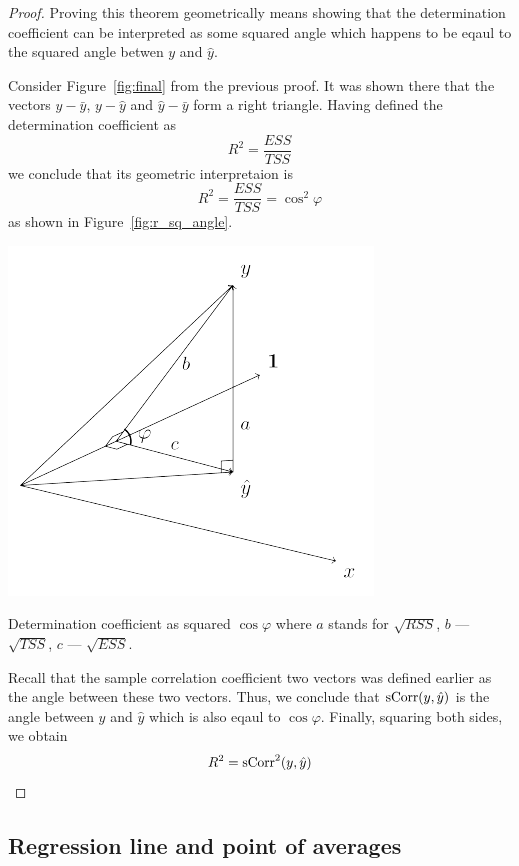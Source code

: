 \begin{proof}
Proving this theorem geometrically means showing that the determination coefficient can be interpreted as some squared angle
which happens to be eqaul to the squared angle betwen $y$ and $\hat y$.

Consider Figure~\ref{fig:final} from the previous proof.
It was shown there that the vectors $y - \bar y$, $y - \hat y$ and $\hat y - \bar y$ form a right triangle.
Having defined the determination coefficient as
\[
R^2 = \frac{ESS}{TSS}
\]
we conclude that its geometric interpretaion is
\[
R^2 = \frac{ESS}{TSS} = \cos^2 \varphi
\]
as shown in Figure~\ref{fig:r_sq_angle}.

\begin{marginfigure}
  \includegraphics{figures/02_determination_coefficient.pdf}
  \caption{Determination coefficient as squared $\cos \varphi$
  where $a$ stands for $\sqrt{RSS}$, $b$ — $\sqrt{TSS}$, $c$ — $\sqrt{ESS}$.}
  \label{fig:r_sq_angle}
\end{marginfigure}

Recall that the sample correlation coefficient two vectors was defined earlier as the angle between these two vectors.
Thus, we conclude that $\operatorname{sCorr}(y, \hat y)$ is the angle between $y$ and $\hat y$ which is also eqaul to $\cos \varphi$.
Finally, squaring both sides, we obtain
\[
R^2 = \operatorname{sCorr}^2(y, \hat y)
\]
\end{proof}


\subsection{Regression line and point of averages}

